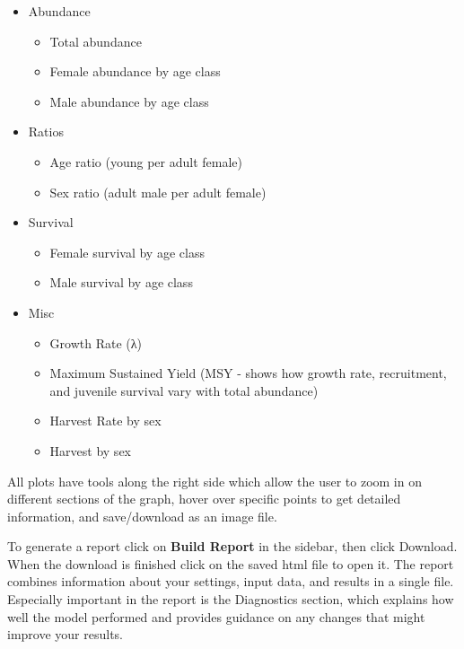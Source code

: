 \documentclass[
]{book}
\providecommand{\tightlist}{%
  \setlength{\itemsep}{0pt}\setlength{\parskip}{0pt}}
\begin{document}
\begin{itemize}
\tightlist
\item
  Abundance

  \begin{itemize}
  \tightlist
  \item
    Total abundance
  \item
    Female abundance by age class
  \item
    Male abundance by age class
  \end{itemize}
\item
  Ratios

  \begin{itemize}
  \tightlist
  \item
    Age ratio (young per adult female)
  \item
    Sex ratio (adult male per adult female)
  \end{itemize}
\item
  Survival

  \begin{itemize}
  \tightlist
  \item
    Female survival by age class
  \item
    Male survival by age class
  \end{itemize}
\item
  Misc

  \begin{itemize}
  \tightlist
  \item
    Growth Rate (λ)
  \item
    Maximum Sustained Yield (MSY - shows how growth rate, recruitment, and juvenile survival vary with total abundance)
  \item
    Harvest Rate by sex
  \item
    Harvest by sex
  \end{itemize}
\end{itemize}

All plots have tools along the right side which allow the user to zoom in on different sections of the graph, hover over specific points to get detailed information, and save/download as an image file.

To generate a report click on \textbf{Build Report} in the sidebar, then click {Download}. When the download is finished click on the saved html file to open it. The report combines information about your settings, input data, and results in a single file. Especially important in the report is the Diagnostics section, which explains how well the model performed and provides guidance on any changes that might improve your results.
\end{document}
